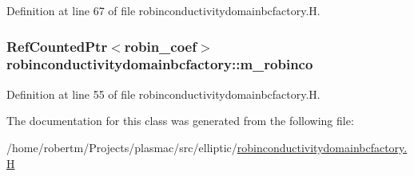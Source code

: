 Definition at line 67 of file robinconductivitydomainbcfactory.\+H.

\subsubsection[{\texorpdfstring{m\+\_\+robinco}{m_robinco}}]{\setlength{\rightskip}{0pt plus 5cm}Ref\+Counted\+Ptr$<${\bf robin\+\_\+coef}$>$ robinconductivitydomainbcfactory\+::m\+\_\+robinco\hspace{0.3cm}{\ttfamily [protected]}}\hypertarget{classrobinconductivitydomainbcfactory_a0bd3387a00dd879229bcb789819fb603}{}\label{classrobinconductivitydomainbcfactory_a0bd3387a00dd879229bcb789819fb603}


Definition at line 55 of file robinconductivitydomainbcfactory.\+H.



The documentation for this class was generated from the following file\+:\begin{DoxyCompactItemize}
\item 
/home/robertm/\+Projects/plasmac/src/elliptic/\hyperlink{robinconductivitydomainbcfactory_8H}{robinconductivitydomainbcfactory.\+H}\end{DoxyCompactItemize}
